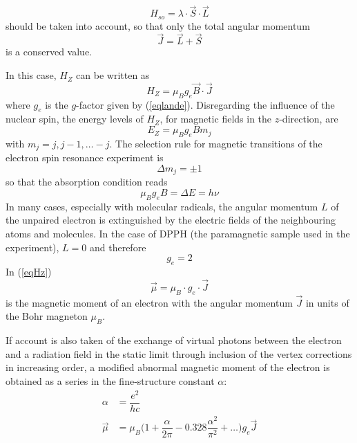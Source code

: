 \documentclass[%
 reprint,
nofootinbib,
 amsmath,amssymb,
 aps,
floatfix,
]{revtex4-2}
\begin{document}
    \begin{equation}
        H_{so} = \lambda \cdot \Vec{S} \cdot \Vec{L} 
    \end{equation}
    should be taken into account, so that only the total angular momentum
    \begin{equation}
        \Vec{J} = \Vec{L} + \Vec{S}
    \end{equation}
    is a conserved value.
    \par
    In this case, $H_Z$ can be written as
    \begin{equation}
    \label{eqHz}
        H_Z = \mu_B g_e \Vec{B} \cdot \Vec{J}
    \end{equation}
    where $g_e$ is the $g$-factor given by (\ref{eqlande}). Disregarding the influence of the nuclear spin, the energy levels of $H_Z$, for magnetic fields in the $z$-direction, are
    \begin{equation}
        E_Z = \mu_B g_e B m_j
    \end{equation}
    with $m_j = j, j-1, \ldots -j$. The selection rule for magnetic transitions of the electron spin resonance experiment is
    \begin{equation}
        \Delta m_j = \pm 1
    \end{equation}
    so that the absorption condition reads
    \begin{equation}
        \mu_B g_e B = \Delta E = h \nu
    \end{equation}
    In many cases, especially with molecular radicals, the angular momentum $L$ of the unpaired electron is extinguished by the electric fields of the neighbouring atoms and molecules. In the case of DPPH (the paramagnetic sample used in the experiment), $L = 0$ and therefore
    \begin{equation}
        g_e = 2
    \end{equation}
    In (\ref{eqHz})
    \begin{equation}
        \Vec{\mu} = \mu_B \cdot g_e \cdot \Vec{J}
    \end{equation}
    is the magnetic moment of an electron with the angular momentum $\Vec{J}$ in units of the Bohr magneton $\mu_B$.
    \par
    If account is also taken of the exchange of virtual photons between the electron and a radiation field in the static limit through inclusion of the vertex corrections in increasing order, a modified abnormal magnetic moment of the electron is obtained as a series in the fine-structure constant $\alpha$:
    \begin{equation}
    \label{eqalpha}
        \begin{split}
            \alpha
            &= \dfrac{e^2}{hc} \\
            \Vec{\mu}
            &= \mu_B \Big( 1 + \dfrac{\alpha}{2 \pi} - 0.328 \dfrac{\alpha^2}{\pi^2} + \ldots \Big) g_e \Vec{J}
        \end{split}
    \end{equation}
\end{document}
